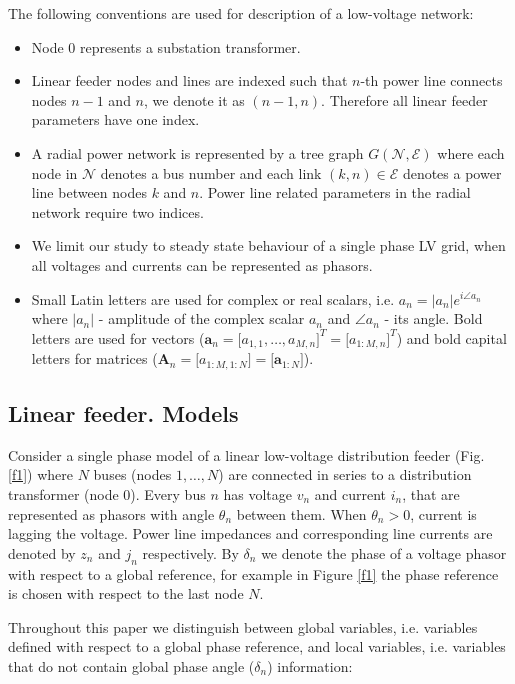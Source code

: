 \documentclass[journal,10pt,onecolumn,draftclsnofoot,]{IEEEtran}
\theoremstyle{plain}
\theoremstyle{definition}
\theoremstyle{remark}
\begin{document}
The following conventions are used for description of a low-voltage network:
\begin{itemize}
  \item Node $0$ represents a substation transformer.
  \item Linear feeder nodes and lines are indexed such that $n$-th power line connects nodes $n-1$ and $n$, we denote it as $(n-1, n)$. Therefore all linear feeder parameters have one index.
  \item A radial power network is represented by a tree graph $G(\mathcal{N}, \mathcal{E})$ where each node in $\mathcal{N}$ denotes a bus number and each link $(k, n) \in \mathcal{E}$ denotes a power line between nodes $k$ and $n$. Power line related parameters in the radial network require two indices.
  \item We limit our study to steady state behaviour of a single phase LV grid, when all voltages and currents can be represented as phasors.
  \item Small Latin letters are used for complex or real scalars, i.e. $a_n = |a_n|e^{i\angle a_n}$ where $|a_n|$ - amplitude of the complex scalar $a_n$ and $\angle a_n$ - its angle. Bold letters are used for vectors ($\bm{a}_n = \big[a_{1, 1}, \ldots, a_{M, n}\big]^T = \big[a_{1:M, n}\big]^T$) and bold capital letters for matrices ($\bm{A}_n = \big[a_{1:M, 1:N}\big] = \big[\bm{a}_{1:N}\big]$). 
\end{itemize}

\subsection{Linear feeder. Models} 

Consider a single phase model of a linear low-voltage distribution feeder (Fig. \ref{f1}) where $N$ buses (nodes $1, \ldots, N$) are connected in series to a distribution transformer (node $0$). Every bus $n$ has voltage $v_n$ and current $i_n$, that are represented as phasors with angle $\theta_n$ between them. When $\theta_n > 0$, current is lagging the voltage. Power line impedances and corresponding line currents are denoted by $z_n$ and $j_n$ respectively. By $\delta_n$ we denote the phase of a voltage phasor with respect to a global reference, for example in Figure \ref{f1} the phase reference is chosen with respect to the last node $N$.

Throughout this paper we distinguish between global variables, i.e. variables defined with respect to a global phase reference, and local variables, i.e. variables that do not contain global phase angle ($\delta_n$) information:
\end{document}
